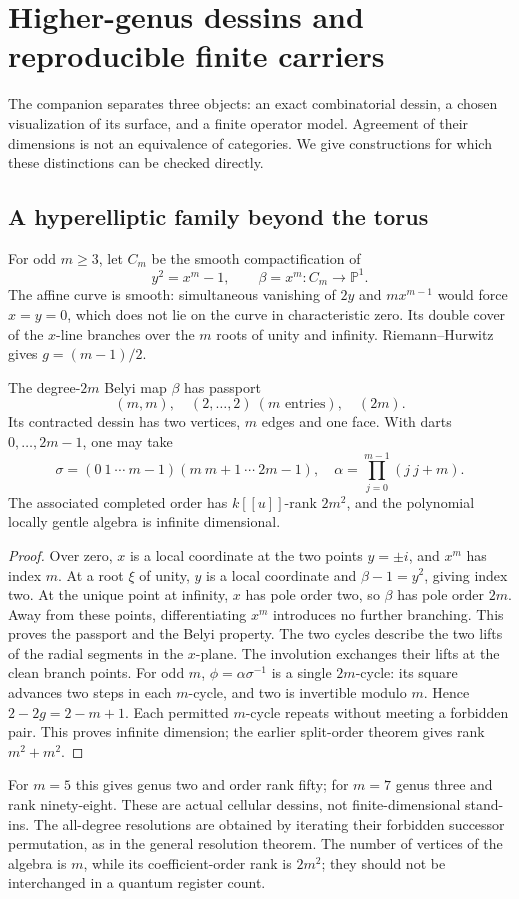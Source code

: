 \chapter{Higher-genus dessins and reproducible finite carriers}
\label{book:computations}
The companion separates three objects: an exact combinatorial dessin, a chosen visualization of its surface, and a finite operator model. Agreement of their dimensions is not an equivalence of categories. We give constructions for which these distinctions can be checked directly.

\section{A hyperelliptic family beyond the torus}
For odd $m\ge3$, let $C_m$ be the smooth compactification of
\[
 y^2=x^m-1,\qquad \beta=x^m:C_m\longrightarrow\mathbb P^1.
\]
The affine curve is smooth: simultaneous vanishing of $2y$ and $mx^{m-1}$ would force $x=y=0$, which does not lie on the curve in characteristic zero. Its double cover of the $x$-line branches over the $m$ roots of unity and infinity. Riemann--Hurwitz gives $g=(m-1)/2$.

\begin{proposition}
The degree-$2m$ Belyi map $\beta$ has passport
\[
 (m,m),\quad (2,\ldots,2)\ (m\text{ entries}),\quad (2m).
\]
Its contracted dessin has two vertices, $m$ edges and one face. With darts $0,\ldots,2m-1$, one may take
\[
 \sigma=(0\ 1\ \cdots\ m-1)(m\ m+1\ \cdots\ 2m-1),\quad
 \alpha=\prod_{j=0}^{m-1}(j\ j+m).
\]
The associated completed order has $k[[u]]$-rank $2m^2$, and the polynomial locally gentle algebra is infinite dimensional.
\end{proposition}
\begin{proof}
Over zero, $x$ is a local coordinate at the two points $y=\pm i$, and $x^m$ has index $m$. At a root $\xi$ of unity, $y$ is a local coordinate and $\beta-1=y^2$, giving index two. At the unique point at infinity, $x$ has pole order two, so $\beta$ has pole order $2m$. Away from these points, differentiating $x^m$ introduces no further branching. This proves the passport and the Belyi property. The two cycles describe the two lifts of the radial segments in the $x$-plane. The involution exchanges their lifts at the clean branch points. For odd $m$, $\phi=\alpha\sigma^{-1}$ is a single $2m$-cycle: its square advances two steps in each $m$-cycle, and two is invertible modulo $m$. Hence $2-2g=2-m+1$. Each permitted $m$-cycle repeats without meeting a forbidden pair. This proves infinite dimension; the earlier split-order theorem gives rank $m^2+m^2$.
\end{proof}
For $m=5$ this gives genus two and order rank fifty; for $m=7$ genus three and rank ninety-eight. These are actual cellular dessins, not finite-dimensional stand-ins. The all-degree resolutions are obtained by iterating their forbidden successor permutation, as in the general resolution theorem. The number of vertices of the algebra is $m$, while its coefficient-order rank is $2m^2$; they should not be interchanged in a quantum register count.

